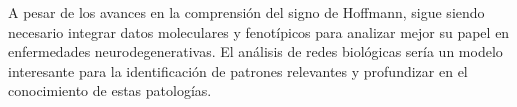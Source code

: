 A pesar de los avances en la comprensión del signo de Hoffmann, sigue siendo necesario integrar datos moleculares y fenotípicos para analizar mejor su papel en enfermedades neurodegenerativas. El análisis de redes biológicas sería un modelo interesante para la identificación de patrones relevantes y profundizar en el conocimiento de estas patologías.









